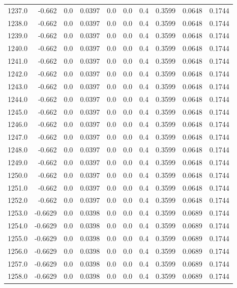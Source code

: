\begin{longtable}{lrrrrrrrrr}
1237.0 & -0.662 & 0.0 & 0.0397 & 0.0 & 0.0 & 0.4 & 0.3599 & 0.0648 & 0.1744 \\
1238.0 & -0.662 & 0.0 & 0.0397 & 0.0 & 0.0 & 0.4 & 0.3599 & 0.0648 & 0.1744 \\
1239.0 & -0.662 & 0.0 & 0.0397 & 0.0 & 0.0 & 0.4 & 0.3599 & 0.0648 & 0.1744 \\
1240.0 & -0.662 & 0.0 & 0.0397 & 0.0 & 0.0 & 0.4 & 0.3599 & 0.0648 & 0.1744 \\
1241.0 & -0.662 & 0.0 & 0.0397 & 0.0 & 0.0 & 0.4 & 0.3599 & 0.0648 & 0.1744 \\
1242.0 & -0.662 & 0.0 & 0.0397 & 0.0 & 0.0 & 0.4 & 0.3599 & 0.0648 & 0.1744 \\
1243.0 & -0.662 & 0.0 & 0.0397 & 0.0 & 0.0 & 0.4 & 0.3599 & 0.0648 & 0.1744 \\
1244.0 & -0.662 & 0.0 & 0.0397 & 0.0 & 0.0 & 0.4 & 0.3599 & 0.0648 & 0.1744 \\
1245.0 & -0.662 & 0.0 & 0.0397 & 0.0 & 0.0 & 0.4 & 0.3599 & 0.0648 & 0.1744 \\
1246.0 & -0.662 & 0.0 & 0.0397 & 0.0 & 0.0 & 0.4 & 0.3599 & 0.0648 & 0.1744 \\
1247.0 & -0.662 & 0.0 & 0.0397 & 0.0 & 0.0 & 0.4 & 0.3599 & 0.0648 & 0.1744 \\
1248.0 & -0.662 & 0.0 & 0.0397 & 0.0 & 0.0 & 0.4 & 0.3599 & 0.0648 & 0.1744 \\
1249.0 & -0.662 & 0.0 & 0.0397 & 0.0 & 0.0 & 0.4 & 0.3599 & 0.0648 & 0.1744 \\
1250.0 & -0.662 & 0.0 & 0.0397 & 0.0 & 0.0 & 0.4 & 0.3599 & 0.0648 & 0.1744 \\
1251.0 & -0.662 & 0.0 & 0.0397 & 0.0 & 0.0 & 0.4 & 0.3599 & 0.0648 & 0.1744 \\
1252.0 & -0.662 & 0.0 & 0.0397 & 0.0 & 0.0 & 0.4 & 0.3599 & 0.0648 & 0.1744 \\
1253.0 & -0.6629 & 0.0 & 0.0398 & 0.0 & 0.0 & 0.4 & 0.3599 & 0.0689 & 0.1744 \\
1254.0 & -0.6629 & 0.0 & 0.0398 & 0.0 & 0.0 & 0.4 & 0.3599 & 0.0689 & 0.1744 \\
1255.0 & -0.6629 & 0.0 & 0.0398 & 0.0 & 0.0 & 0.4 & 0.3599 & 0.0689 & 0.1744 \\
1256.0 & -0.6629 & 0.0 & 0.0398 & 0.0 & 0.0 & 0.4 & 0.3599 & 0.0689 & 0.1744 \\
1257.0 & -0.6629 & 0.0 & 0.0398 & 0.0 & 0.0 & 0.4 & 0.3599 & 0.0689 & 0.1744 \\
1258.0 & -0.6629 & 0.0 & 0.0398 & 0.0 & 0.0 & 0.4 & 0.3599 & 0.0689 & 0.1744 \\

\end{longtable}
